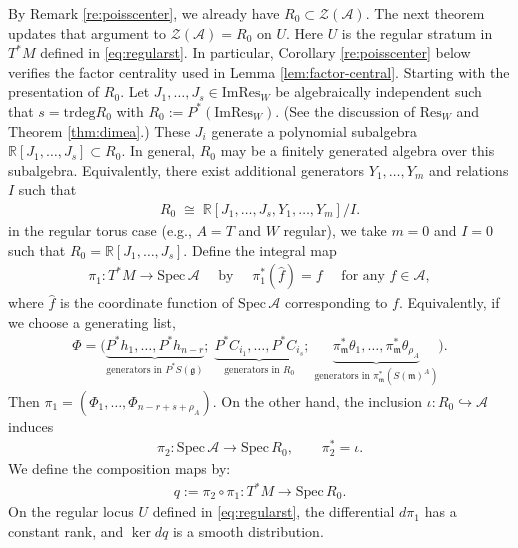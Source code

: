 \documentclass[11pt]{amsart}
\theoremstyle{definition}
\theoremstyle{plain}
\theoremstyle{conclusion}
\begin{document}
By Remark \ref{re:poisscenter}, we already have $R_0\subset \mathcal{Z}(\mathcal{A})$. The next theorem updates that argument to $\mathcal{Z}(\mathcal{A})=R_0$ on $U$. Here $U$ is the regular stratum in $T^*M$ defined in \eqref{eq:regularst}. In particular, Corollary \ref{re:poisscenter} below verifies the factor centrality used in Lemma \ref{lem:factor-central}. %
 Starting with the presentation of $R_0$. Let $J_1,\ldots,J_s\in \mathrm{Im}\mathrm{Res}_W$ be algebraically independent such that $s=\mathrm{trdeg} R_0$ with $R_0:=P^{*}(\mathrm{Im}\mathrm{Res}_W)$. (See the discussion of 
$\mathrm{Res}_W$ and Theorem \ref{thm:dimea}.)  These $J_i$ generate a polynomial subalgebra $\mathbb{R}[J_1,\ldots,J_s]\subset R_0$. In general, 
$R_0$ may be a finitely generated algebra over this subalgebra.  Equivalently, there exist additional generators $Y_1,\ldots,Y_m$ and relations $I$ such that \begin{align*}
    R_0 \;\cong\; \mathbb{R}[J_1,\ldots,J_s,Y_1,\ldots,Y_m]\big/ I.
\end{align*} in the regular torus case (e.g., $A=T$ and $W$ regular), we take $m=0$ and $I=0$ such that  $R_0=\mathbb{R}[J_1,\ldots,J_s]$. Define the  integral map  \begin{align*}
    \pi_1  :  T^*M \longrightarrow \mathrm{Spec} \, \mathcal{A} \quad\text{ by }\quad \pi_1^*(\widehat{f}) = f\quad \text{ for any }f \in \mathcal{A},
\end{align*}  where $\widehat{f}$ is the coordinate function of $\mathrm{Spec} \, \mathcal{A}$ corresponding to $f$. Equivalently, if we choose a generating list, \begin{align}
    \Phi =\bigl(\underbrace{P^*h_1,\ldots,P^*h_{n-r}}_{\text{generators in $P^*S(\mathfrak{g})$}};\;\underbrace{P^*C_{i_1},\ldots,P^*C_{i_s}}_{\text{generators in $R_0$}};\;\underbrace{\pi_\mathfrak{m}^*\theta_1,\ldots,\pi_\mathfrak{m}^*\theta_{\rho_A}}_{\text{generators in $\pi_\mathfrak{m}^*(S(\mathfrak{m})^A)$}}\bigr). \label{eq:generatorsmp}
\end{align}  Then $\pi_1=(\Phi_1,\ldots,\Phi_{n -r + s+ \rho_A})$. On the other hand, the inclusion $\iota: R_0 \hookrightarrow \mathcal{A}$ induces \begin{align*}
    \pi_2 :\mathrm{Spec} \, \mathcal{A} \longrightarrow \mathrm{Spec} \, R_0, \qquad \pi_2^*=\iota .
\end{align*} We define the composition maps by:  \begin{align*}
    q:= \pi_2 \circ \pi_1 :T^*M \longrightarrow \mathrm{Spec} \, R_0 .
\end{align*} On the regular locus $U$ defined in \eqref{eq:regularst}, the differential $d\pi_1$ has a constant rank, and $\ker dq$ is a smooth distribution.
\end{document}
